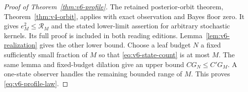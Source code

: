 \begin{proof}[Proof of Theorem~\ref{thm:v6-profile}]
The retained posterior-orbit theorem, Theorem~\ref{thm:v4-orbit}, applies
with exact observation and Bayes floor zero. It gives $e_M^2\le\mathcal R_M$
and the stated lower-limit assertion for arbitrary stochastic kernels.
Its full proof is included in both reading editions. Lemma~\ref{lem:v6-realization}
gives the other lower bound. Choose a leaf budget $N$ a fixed sufficiently
small fraction of $M$ so that \eqref{eq:v6-state-count} is at most $M$.
The same lemma and fixed-budget dilation give an upper bound
$CG_N\le C'G_M$. A one-state observer handles the remaining bounded
range of $M$. This proves \eqref{eq:v6-profile-law}.
\end{proof}
